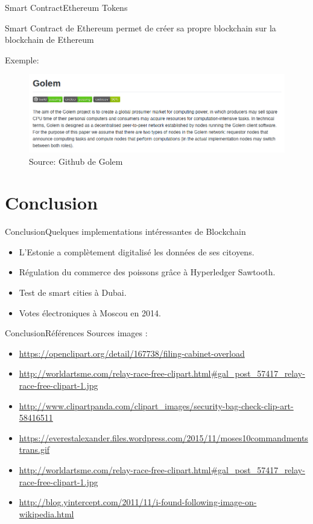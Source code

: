 \documentclass[xcolor=dvipsnames]{beamer}
\begin{document}
\begin{frame}{Smart Contract}{Ethereum Tokens}

	\begin{center}
		\color{blue}
		Smart Contract de Ethereum permet de créer sa propre blockchain sur la blockchain de Ethereum
	\end{center}
	
	Exemple:
	\begin{figure}
	\includegraphics[scale=.35]{golem}
	\caption{Source: Github de Golem}
	\end{figure}

\end{frame}

\section{Conclusion}

\begin{frame}{Conclusion}{Quelques implementations intéressantes de Blockchain}

	\begin{itemize}
		\item L'Estonie a complètement digitalisé les données de ses citoyens.
		\item Régulation du commerce des poissons grâce à Hyperledger Sawtooth.
		\item Test de smart cities à Dubai.
		\item Votes électroniques à Moscou en 2014.
	\end{itemize}
	
\end{frame}

\begin{frame}{Conclusion}{Références}
Sources images :
\begin{itemize}
\item \url{https://openclipart.org/detail/167738/filing-cabinet-overload}
\item \url{http://worldartsme.com/relay-race-free-clipart.html\#gal_post_57417_relay-race-free-clipart-1.jpg}
\item \url{http://www.clipartpanda.com/clipart_images/security-bag-check-clip-art-58416511}
\item \url{https://everestalexander.files.wordpress.com/2015/11/moses10commandmentstrans.gif}
\item \url{http://worldartsme.com/relay-race-free-clipart.html\#gal_post_57417_relay-race-free-clipart-1.jpg}
\item \url{http://blog.yintercept.com/2011/11/i-found-following-image-on-wikipedia.html}
\end{itemize}
\end{frame}
\end{document}
